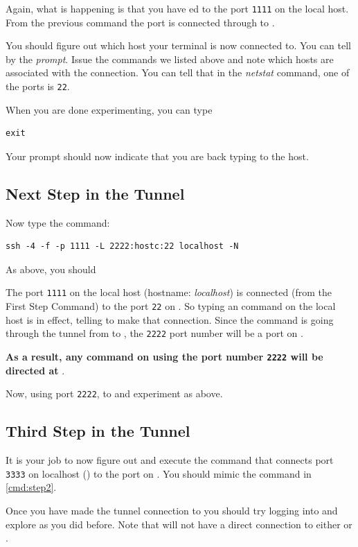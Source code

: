 Again, what is happening is that you have {\ssh}ed to the port
\texttt{1111} on the local host.  From the previous command the port
is connected through  to .

You should figure out which host your terminal is now connected
to. You can tell by the \textit{prompt}.
Issue the commands we listed above and note which hosts are associated
with the \ssh connection.  You can tell that in the \textit{netstat}
command, one of the ports is \texttt{22}.

When you are done experimenting, you can type
\begin{verbatim}
exit
\end{verbatim}
Your prompt should now indicate that you are back typing to the \base host.

\subsection{Next Step in the Tunnel}
Now type the command:
\begin{verbatim}
ssh -4 -f -p 1111 -L 2222:hostc:22 localhost -N
\end{verbatim}
\label{cmd:step2}
As above, you should 

The port \texttt{1111} on the local host (hostname: \textit{localhost}) is
connected (from the First Step Command) to the \ssh port \texttt{22} on
.  So typing an \ssh command on the local host is in effect,
telling  to make that connection. Since the \ssh command
is going through the tunnel from \base to ,  the \texttt{2222}
port number will be a port on \base. 


\textbf{As a result, any \ssh command on \base using the port number
  \texttt{2222} will be directed at }.

Now, using port \texttt{2222}, \ssh to  and experiment as
above. 

\subsection{Third Step in the Tunnel}

It is your job to now figure out and execute the \ssh command that
connects port \texttt{3333} on localhost (\base) to the \ssh port on .
You should mimic the command in \ref{cmd:step2}.

Once you have made the tunnel connection to  you should try
logging into  and explore as you did before.  Note that
 will not have a direct connection to either \base or .

